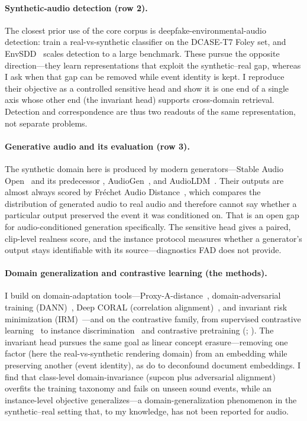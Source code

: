 \documentclass{article}
\begin{document}
\paragraph{Synthetic-audio detection (row 2).} The closest prior use of the core corpus is
deepfake-environmental-audio detection: \citet{ouajdi2024deepfake} train a real-vs-synthetic
classifier on the DCASE-T7 Foley set, and EnvSDD~\citep{yin2025envsdd} scales detection to a large
benchmark. These pursue the opposite direction---they learn representations that exploit
the synthetic--real gap, whereas I ask when that gap can be removed while event identity is
kept. I reproduce their objective as a controlled sensitive head and show it is one end of a
single axis whose other end (the invariant head) supports cross-domain retrieval. Detection
and correspondence are thus two readouts of the same representation, not separate problems.

\paragraph{Generative audio and its evaluation (row 3).} The synthetic domain here is produced by
modern generators---Stable Audio Open~\citep{evans2024stableaudioopen} and its predecessor
\citep{evans2024stableaudio}, AudioGen~\citep{kreuk2023audiogen}, and AudioLDM~\citep{liu2023audioldm}.
Their outputs are almost always scored by Fr\'echet Audio Distance~\citep{kilgour2019fad}, which
compares the distribution of generated audio to real audio and therefore cannot say whether a
particular output preserved the event it was conditioned on. That is an open gap for
audio-conditioned generation specifically. The sensitive head gives a paired, clip-level realness
score, and the instance protocol measures whether a generator's output stays identifiable with its
source---diagnostics FAD does not provide.

\paragraph{Domain generalization and contrastive learning (the methods).} I build on
domain-adaptation tools---Proxy-A-distance~\citep{bendavid2010theory}, domain-adversarial
training (DANN)~\citep{ganin2015dann}, Deep CORAL (correlation alignment)~\citep{sun2016coral}, and invariant risk minimization (IRM)~\citep{arjovsky2019irm}---and
on the contrastive family, from supervised contrastive learning~\citep{khosla2020supcon} to instance
discrimination~\citep{wu2018instance} and contrastive pretraining
(\citealp{chen2020simclr}; \citealp{radford2021clip}). The invariant head pursues the same goal
as linear concept erasure---removing one factor (here the real-vs-synthetic rendering domain) from an
embedding while preserving another (event identity), as \citet{fan2025medium} do to deconfound
document embeddings. I find that class-level domain-invariance (supcon plus
adversarial alignment) overfits the training taxonomy and fails on unseen sound events, while an
instance-level objective generalizes---a domain-generalization phenomenon in the synthetic--real
setting that, to my knowledge, has not been reported for audio.
\end{document}
